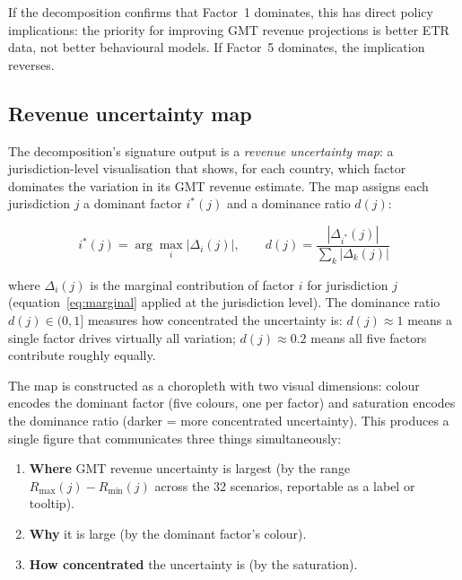 \documentclass[11pt,a4paper]{article}
\begin{document}
If the decomposition confirms that Factor~1 dominates, this has direct policy implications: the priority for improving GMT revenue projections is better ETR data, not better behavioural models. If Factor~5 dominates, the implication reverses.

\subsection{Revenue uncertainty map}\label{sec:uncertainty_map}

The decomposition's signature output is a \emph{revenue uncertainty map}: a jurisdiction-level visualisation that shows, for each country, which factor dominates the variation in its GMT revenue estimate. The map assigns each jurisdiction $j$ a dominant factor $i^*(j)$ and a dominance ratio $d(j)$:

\begin{equation}\label{eq:dominant_factor}
i^*(j) = \arg\max_i \left|\Delta_i(j)\right|, \qquad d(j) = \frac{|\Delta_{i^*}(j)|}{\sum_k |\Delta_k(j)|}
\end{equation}

where $\Delta_i(j)$ is the marginal contribution of factor $i$ for jurisdiction $j$ (equation~\eqref{eq:marginal} applied at the jurisdiction level). The dominance ratio $d(j) \in (0, 1]$ measures how concentrated the uncertainty is: $d(j) \approx 1$ means a single factor drives virtually all variation; $d(j) \approx 0.2$ means all five factors contribute roughly equally.

The map is constructed as a choropleth with two visual dimensions: colour encodes the dominant factor (five colours, one per factor) and saturation encodes the dominance ratio (darker = more concentrated uncertainty). This produces a single figure that communicates three things simultaneously:

\begin{enumerate}
\item \textbf{Where} GMT revenue uncertainty is largest (by the range $R_{\max}(j) - R_{\min}(j)$ across the 32 scenarios, reportable as a label or tooltip).
\item \textbf{Why} it is large (by the dominant factor's colour).
\item \textbf{How concentrated} the uncertainty is (by the saturation).
\end{enumerate}
\end{document}
